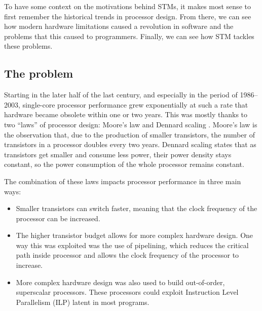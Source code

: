 \documentclass[12pt,a4paper,twoside,openright]{report}
\begin{document}
To have some context on the motivations behind STMs, it makes most
sense to first remember the historical trends in processor
design. From there, we can see how modern hardware limitations caused
a revolution in software and the problems that this caused to
programmers. Finally, we can see how STM tackles these problems.

\subsection{The problem}
\label{sec:problem}

Starting in the later half of the last century, and especially in the
period of 1986--2003, single-core processor performance grew
exponentially at such a rate that hardware became obsolete within one
or two years. This was mostly thanks to two ``laws'' of processor
design: Moore's law \cite{MooreLaw} and Dennard scaling
\cite{DennardScaling}. Moore's law is the observation that, due to the
production of smaller transistors, the number of transistors in a
processor doubles every two years\footnotemark. Dennard scaling states
that as transistors get smaller and consume less power, their power
density stays constant, so the power consumption of the whole
processor remains constant.


The combination of these laws impacts processor performance in three
main ways:

\begin{itemize}
\item Smaller transistors can switch faster, meaning that the clock
  frequency of the processor can be increased.
  
\item The higher transistor budget allows for more complex hardware
  design. One way this was exploited was the use of pipelining, which
  reduces the critical path inside processor and allows the clock
  frequency of the processor to increase.
  
\item More complex hardware design was also used to build
  out-of-order, superscalar processors. These processors could exploit
  Instruction Level Parallelism (ILP) \cite[Chapter~3]{CompArchBook}
  latent in most programs.
\end{itemize}
\end{document}
